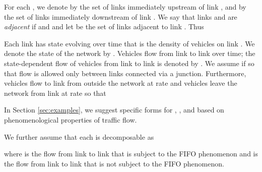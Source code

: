 \documentclass[letterpaper, 10 pt, conference]{ieeeconf}
\begin{document}
For each , we denote by  the set of links immediately upstream of link , and by  the set of links immediately downstream of link . We say that links  and  are \emph{adjacent} if  and  and let  be the set of links adjacent to link . Thus





Each link  has state  evolving over time that is the density of vehicles on link . We denote the  state of the network by . Vehicles flow from link to link over time; the state-dependent flow of vehicles from link  to link  is denoted by . We assume  if  so that flow is allowed only between links connected via a junction.  Furthermore, vehicles flow to link  from outside the network at rate  and vehicles leave the network from link  at rate  so that


In Section \ref{sec:examples}, we suggest specific forms for , , and  based on phenomenological properties of traffic flow. 

\newcommand{\fF}{f^\textnormal{F}}
\newcommand{\fNF}{f^\textnormal{NF}}

We further assume that each  is decomposable as

where  is the flow from link  to link  that is subject to the FIFO phenomenon and  is the flow from link  to link  that is not subject to the FIFO phenomenon.
\end{document}
